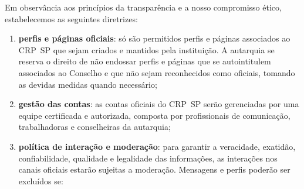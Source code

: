 Em observância aos princípios da transparência e a nosso compromisso
ético, estabelecemos as seguintes diretrizes:

\begin{enumerate}

  \item
        \textbf{perfis e páginas oficiais}: só são permitidos perfis e páginas
        associados ao CRP~SP que sejam criados e mantidos pela instituição. A
        autarquia se reserva o direito de não endossar perfis e páginas que se
        autointitulem associados ao Conselho e que não sejam reconhecidos como
        oficiais, tomando as devidas medidas quando necessário;
  \item
        \textbf{gestão das contas}: as contas oficiais do CRP~SP serão
        gerenciadas por uma equipe certificada e autorizada, composta por
        profissionais de comunicação, trabalhadoras e conselheiras da
        autarquia;
  \item
        \textbf{política de interação e moderação}: para garantir a
        veracidade, exatidão, confiabilidade, qualidade e legalidade das
        informações, as interações nos canais oficiais estarão sujeitas a
        moderação. Mensagens e perfis poderão ser excluídos se:

        \begin{enumerate}


\end{enumerate}
\end{enumerate}
